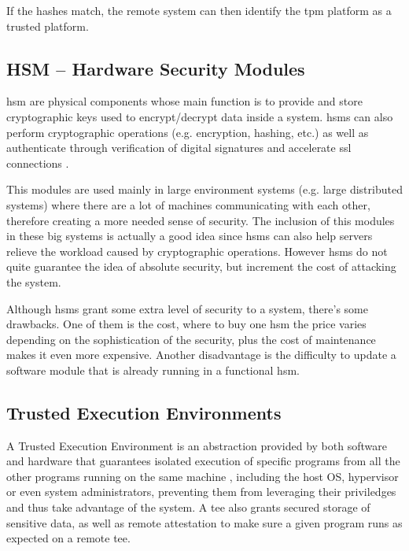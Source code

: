 If the hashes match, the remote system can then identify the \gls{tpm} platform as a trusted platform.

\subsection{HSM – Hardware Security Modules}
\label{ssec:hsm}

\gls{hsm} \cite{hsmPaper} are physical components whose main function is to provide and store cryptographic keys used to encrypt/decrypt data inside a system. \gls{hsm}s can also perform cryptographic operations (e.g. encryption, hashing, etc.) as well as authenticate through verification of digital signatures and accelerate \gls{ssl} connections \cite{hsmThesis}.

This modules are used mainly in large environment systems (e.g. large distributed systems) where there are a lot of machines communicating with each other, therefore creating a more needed sense of security. The inclusion of this modules in these big systems is actually a good idea since \gls{hsm}s can also help servers relieve the workload caused by cryptographic operations. However \gls{hsm}s do not quite guarantee the idea of absolute security, but increment the cost of attacking the system.

Although \gls{hsm}s grant some extra level of security to a system, there's some drawbacks. One of them is the cost, where to buy one \gls{hsm} the price varies depending on the sophistication of the security, plus the cost of maintenance makes it even more expensive. Another disadvantage is the difficulty to update a software module that is already running in a functional \gls{hsm}.

\subsection{Trusted Execution Environments}
\label{ssec:tee}

A Trusted Execution Environment is an abstraction provided by both software and hardware that guarantees isolated execution of specific programs from all the other programs running on the same machine \cite{guiBorgesThesis}, including the host OS, hypervisor or even system administrators, preventing them from leveraging their priviledges and thus take advantage of the system. A \gls{tee} also grants secured storage of sensitive data, as well as remote attestation to make sure a given program runs as expected on a remote \gls{tee}. 

